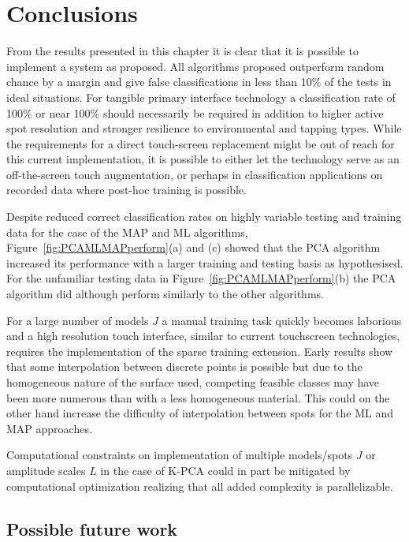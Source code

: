 \section{Conclusions}
From the results presented in this chapter it is clear that it is possible to implement a system as proposed. All algorithms proposed outperform random chance by a margin and give false classifications in less than 10\% of the tests in ideal situations. For tangible primary interface technology a classification rate of 100\% or near 100\% should necessarily be required in addition to higher active spot resolution and stronger resilience to environmental and tapping types. While the requirements for a direct touch-screen replacement might be out of reach for this current implementation, it is possible to either let the technology serve as an off-the-screen touch augmentation, or perhaps in classification applications on recorded data where post-hoc training is possible.

Despite reduced correct classification rates on highly variable testing and training data for the case of the MAP and ML algorithms, Figure~\ref{fig:PCAMLMAPperform}(a) and (c) showed that the PCA algorithm increased its performance with a larger training and testing basis as hypothesised. For the unfamiliar testing data in Figure~\ref{fig:PCAMLMAPperform}(b) the PCA algorithm did although perform similarly to the other algorithms.

For a large number of models $J$ a manual training task quickly becomes laborious and a high resolution touch interface, similar to current touchscreen technologies, requires the implementation of the sparse training extension. Early results show that some interpolation between discrete points is possible but due to the homogeneous nature of the surface used, competing feasible classes may have been more numerous than with a less homogeneous material. This could on the other hand increase the difficulty of interpolation between spots for the ML and MAP approaches.

Computational constraints on implementation of multiple models/spots $J$ or amplitude scales $L$ in the case of K-PCA could in part be mitigated by computational optimization realizing that all added complexity is parallelizable.

\subsection{Possible future work}
